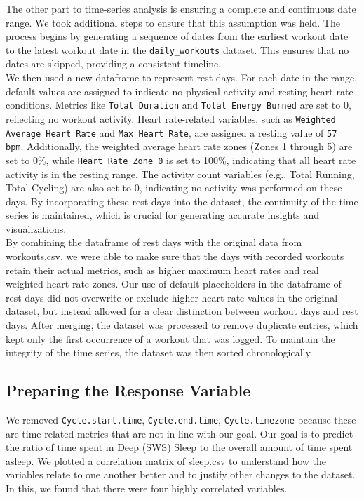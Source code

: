 \documentclass{article}
\begin{document}
The other part to time-series analysis is ensuring a complete and continuous date range. We took additional steps to ensure that this assumption was held. The process begins by generating a sequence of dates from the earliest workout date to the latest workout date in the \verb|daily_workouts| dataset. This ensures that no dates are skipped, providing a consistent timeline. \\

We then used a new dataframe to represent rest days. For each date in the range, default values are assigned to indicate no physical activity and resting heart rate conditions. Metrics like \texttt{Total Duration} and \texttt{Total Energy Burned} are set to 0, reflecting no workout activity. Heart rate-related variables, such as \texttt{Weighted Average Heart Rate} and \texttt{Max Heart Rate}, are assigned a resting value of \texttt{57 bpm}. Additionally, the weighted average heart rate zones (Zones 1 through 5) are set to 0\%, while \texttt{Heart Rate Zone 0} is set to 100\%, indicating that all heart rate activity is in the resting range. The activity count variables (e.g., Total Running, Total Cycling) are also set to 0, indicating no activity was performed on these days. By incorporating these rest days into the dataset, the continuity of the time series is maintained, which is crucial for generating accurate insights and visualizations. \\

By combining the dataframe of rest days with the original data from workouts.csv, we were able to make sure that the days with recorded workouts retain their actual metrics, such as higher maximum heart rates and real weighted heart rate zones. Our use of default placeholders in the dataframe of rest days did not overwrite or exclude higher heart rate values in the original dataset, but instead allowed for a clear distinction between workout days and rest days. After merging, the dataset was processed to remove duplicate entries, which kept only the first occurrence of a workout that was logged. To maintain the integrity of the time series, the dataset was then sorted chronologically. 

\subsection{\small {Preparing the Response Variable }}

We removed  \texttt{Cycle.start.time}, \texttt{Cycle.end.time}, \texttt{Cycle.timezone} because these are time-related metrics that are not in line with our goal. Our goal is to predict the ratio of time spent in Deep (SWS) Sleep to the overall amount of time spent asleep. We plotted a correlation matrix of sleep.csv to understand how the variables relate to one another better and to justify other changes to the dataset. In this, we found that there were four highly correlated variables. \\
\end{document}
